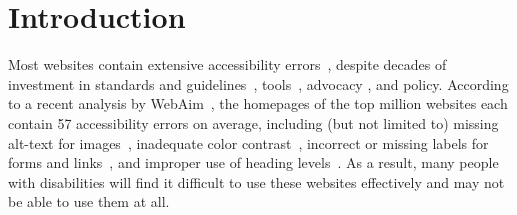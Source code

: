 \label{intro}
\section{Introduction}

\begin{comment}
    \begin{outline}
    \1 problem of web inaccessibility / developer unawareness
        \2 long standing challenge
        \2 estimated 1.6 billion people worldwide have a disability that affects their internet usage
        \2 96\% of top 1 million visited websites have accessibility errors
        \2 errors include lacking alt-text, labels, aria roles, etc.
        \2 developers do not produce accessible code
    \1 prior work
        \2 creating accessibility developer tools
        \2 building awareness among developers
        \2 does not cover novice, self-learning developers -- not a small population (1 in 3)
    \1 novelty
        \2 ai coding assistants
        \2 what are they?
        \2 high adoption especially among novice developers (76\%)
        \2 potential automation of code accessibility
    \1 research questions
        \2 can their usage help novice developers create more accessible web components? 
        \2 how can they be enhanced for effectiveness in producing more accessible UI code?
    \1 contributions
        \2 key design goals for optimising ai assistants for a11y
        \2 codea11y: system implementation and evaluation
    \1 findings and implications
        \2 coding assistants produce accessible code contingent on developer awareness
        \2 assistants should be a11y aware and reinforcing a11y practices to developers
        \2 placeholder results for the user evaluation
        \2 exploring ai assistants as second "brain" not hand for non-funct reqmts
\end{outline}
\end{comment}

Most websites contain extensive accessibility errors~\cite{webaim2024}, despite decades of investment in standards and guidelines~\cite{chisholm2001web, caldwell2008web}, tools~\cite{adesigner, takagi2003accessibility, bigham2010accessibility}, advocacy \cite{sloan2006contextual, martin2022landscape, pandey2023blending}, and policy. According to a recent analysis by WebAim~\cite{webaim2024}, the homepages of the top million websites each contain 57 accessibility errors on average, including (but not limited to) missing alt-text for images~\cite{webinsight,twitterally}, inadequate color contrast~\cite{colors}, incorrect or missing labels for forms and links~\cite{formlabels}, and improper use of heading levels~\cite{headings}. As a result, many people with disabilities will find it difficult to use these websites effectively and may not be able to use them at all.


